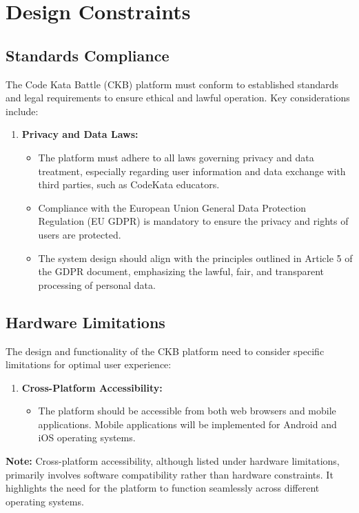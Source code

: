 \newpage
\section{Design Constraints}
\label{sec:design_constraints}%

\subsection{Standards Compliance}
\label{subsec:standards_compliance}%
The Code Kata Battle (CKB) platform must conform to established standards and legal requirements to ensure ethical and lawful operation. Key considerations include:

\begin{enumerate}
    \item \textbf{Privacy and Data Laws:}
          \begin{itemize}
              \item The platform must adhere to all laws governing privacy and data treatment, especially regarding user information and data exchange with third parties, such as CodeKata educators.
              \item Compliance with the European Union General Data Protection Regulation (EU GDPR) is mandatory to ensure the privacy and rights of users are protected.
              \item The system design should align with the principles outlined in Article 5 of the GDPR document, emphasizing the lawful, fair, and transparent processing of personal data.
          \end{itemize}
\end{enumerate}

\subsection{Hardware Limitations}
\label{subsec:hardware_limitations}%
The design and functionality of the CKB platform need to consider specific limitations for optimal user experience:

\begin{enumerate}
    \item \textbf{Cross-Platform Accessibility:}
          \begin{itemize}
              \item The platform should be accessible from both web browsers and mobile applications. Mobile applications will be implemented for Android and iOS operating systems.
          \end{itemize}
\end{enumerate}
\textbf{Note:} Cross-platform accessibility, although listed under hardware limitations, primarily involves software compatibility rather than hardware constraints. It highlights the need for the platform to function seamlessly across different operating systems.

